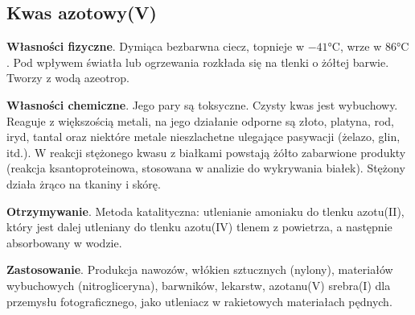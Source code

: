\subsection{Kwas azotowy(V) }
\textbf{Własności fizyczne}.
Dymiąca bezbarwna ciecz, topnieje w $-41\si{\celsius}$, wrze w $86\si{\celsius}$.
Pod wpływem światła lub ogrzewania rozkłada się na tlenki o żółtej barwie.
Tworzy z wodą azeotrop.

\textbf{Własności chemiczne}.
Jego pary są toksyczne.
Czysty kwas jest wybuchowy.
Reaguje z większością metali, na jego działanie odporne są złoto, platyna, rod, iryd, tantal oraz niektóre metale nieszlachetne ulegające pasywacji (żelazo, glin, itd.).
W reakcji stężonego kwasu z białkami powstają żółto zabarwione produkty (reakcja ksantoproteinowa, stosowana w analizie do wykrywania białek).
Stężony działa żrąco na tkaniny i skórę.

\textbf{Otrzymywanie}.
Metoda katalityczna: utlenianie amoniaku do tlenku azotu(II), który jest dalej utleniany  do tlenku azotu(IV) tlenem z powietrza, a następnie absorbowany w wodzie.

\textbf{Zastosowanie}.
Produkcja nawozów, włókien sztucznych (nylony), materiałów wybuchowych (nitrogliceryna), barwników, lekarstw, azotanu(V) srebra(I) dla przemysłu fotograficznego, jako  utleniacz w rakietowych materiałach pędnych.
